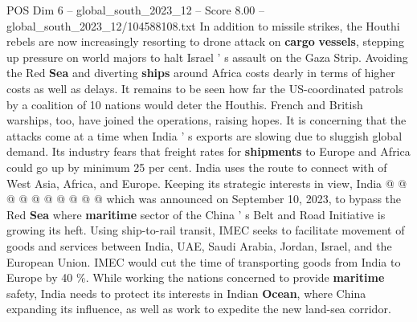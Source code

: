 \begin{textsample}{POS Dim 6 – global\_south\_2023\_12 – Score 8.00 – global\_south\_2023\_12/104588108.txt}
In addition to missile strikes, the Houthi rebels are now increasingly resorting to drone attack on \textbf{cargo} \textbf{vessels}, stepping up pressure on world majors to halt Israel ' s assault on the Gaza Strip.
Avoiding the Red \textbf{Sea} and diverting \textbf{ships} around Africa costs dearly in terms of higher costs as well as delays.
It remains to be seen how far the US-coordinated patrols by a coalition of 10 nations would deter the Houthis.
French and British warships, too, have joined the operations, raising hopes.
It is concerning that the attacks come at a time when India ' s exports are slowing due to sluggish global demand.
Its industry fears that freight rates for \textbf{shipments} to Europe and Africa could go up by minimum 25 per cent.
India uses the route to connect with of West Asia, Africa, and Europe.
Keeping its strategic interests in view, India @ @ @ @ @ @ @ @ @ @ which was announced on September 10, 2023, to bypass the Red \textbf{Sea} where \textbf{maritime} sector of the China ' s Belt and Road Initiative is growing its heft.
Using ship-to-rail transit, IMEC seeks to facilitate movement of goods and services between India, UAE, Saudi Arabia, Jordan, Israel, and the European Union.
IMEC would cut the time of transporting goods from India to Europe by 40 \%.
While working the nations concerned to provide \textbf{maritime} safety, India needs to protect its interests in Indian \textbf{Ocean}, where China expanding its influence, as well as work to expedite the new land-sea corridor.

\end{textsample}
